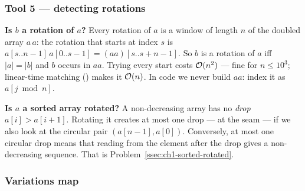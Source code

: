 \subsubsection*{Tool 5 --- detecting rotations}

\textbf{Is $b$ a rotation of $a$?} Every rotation of $a$ is a window of length $n$ of the doubled array $a\,a$: the rotation that starts at index $s$ is $a[s..n-1]\,a[0..s-1] = (aa)[s..s+n-1]$. So $b$ is a rotation of $a$ iff $|a| = |b|$ and $b$ occurs in $aa$. Trying every start costs $\mathcal{O}(n^2)$ --- fine for $n \le 10^3$; linear-time matching () makes it $\mathcal{O}(n)$. In code we never build $aa$: index it as $a[j \bmod n]$.

\textbf{Is $a$ a sorted array rotated?} A non-decreasing array has no \emph{drop} $a[i] > a[i+1]$. Rotating it creates at most one drop --- at the seam --- if we also look at the circular pair $(a[n-1], a[0])$. Conversely, at most one circular drop means that reading from the element after the drop gives a non-decreasing sequence. That is Problem~\ref{ssec:ch1-sorted-rotated}.

\begin{diagrambox}
\end{diagrambox}

\subsubsection*{Variations map}

